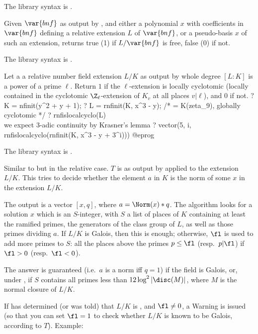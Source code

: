 The library syntax is .

\label{se:rnfisfree}
Given $\var{bnf}$ as output by
, and either a polynomial $x$ with coefficients in $\var{bnf}$
defining a relative extension $L$ of $\var{bnf}$, or a pseudo-basis $x$ of
such an extension, returns true (1) if $L/\var{bnf}$ is free, false (0) if
not.

The library syntax is .

\label{se:rnfislocalcyclo}
Let  a a relative number field extension $L/K$ as output
by  whole degree $[L:K]$ is a power of a prime $\ell$.
Return $1$ if the $\ell$-extension is locally cyclotomic (locally contained in
the cyclotomic $\Z_\ell$-extension of $K_v$ at all places $v | \ell$), and
$0$ if not.
\bprog
? K = nfinit(y^2 + y + 1);
? L = rnfinit(K, x^3 - y); /* = K(zeta_9), globally cyclotomic */
? rnfislocalcyclo(L)
\\ we expect 3-adic continuity by Krasner's lemma
? vector(5, i, rnfislocalcyclo(rnfinit(K, x^3 - y + 3^i)))
@eprog

The library syntax is .

\label{se:rnfisnorm}
Similar to
 but in the relative case. $T$ is as output by
 applied to the extension $L/K$. This tries to decide
whether the element $a$ in $K$ is the norm of some $x$ in the extension
$L/K$.

The output is a vector $[x,q]$, where $a = \Norm(x)*q$. The
algorithm looks for a solution $x$ which is an $S$-integer, with $S$ a list
of places of $K$ containing at least the ramified primes, the generators of
the class group of $L$, as well as those primes dividing $a$. If $L/K$ is
Galois, then this is enough; otherwise, $\fl$ is used to add more primes to
$S$: all the places above the primes $p \leq \fl$ (resp.~$p|\fl$) if $\fl>0$
(resp.~$\fl<0$).

The answer is guaranteed (i.e.~$a$ is a norm iff $q = 1$) if the field is
Galois, or, under , if $S$ contains all primes less than
$12\log^2\left|\disc(M)\right|$, where $M$ is the normal
closure of $L/K$.

If  has determined (or was told) that $L/K$ is
, and $\fl \neq 0$, a Warning is issued (so that you can set
$\fl = 1$ to check whether $L/K$ is known to be Galois, according to $T$).
Example:


